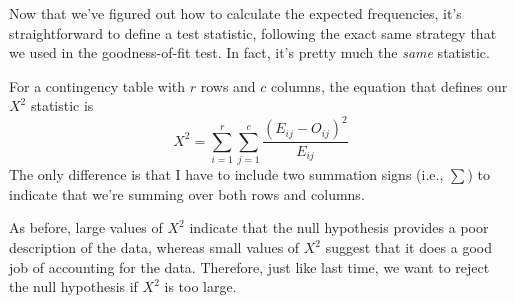 \vspace{0.5cm}
\begin{mdframed}[style=MyFrame,nobreak=true]
Now that we've figured out how to calculate the expected frequencies, it's straightforward to define a test statistic, following the exact same strategy that we used in the goodness-of-fit test. In fact, it's pretty much the {\it same} statistic. 

For a contingency table with $r$ rows and $c$ columns, the equation that defines our $X^2$ statistic is 
$$
X^2 = \sum_{i=1}^r\sum_{j=1}^c \frac{({E}_{ij} - O_{ij})^2}{{E}_{ij}}
$$
The only difference is that I have to include two summation signs (i.e., $\sum$) to indicate that we're summing over both rows and columns. 
\end{mdframed}

As before, large values of $X^2$ indicate that the null hypothesis provides a poor description of the data, whereas small values of $X^2$ suggest that it does a good job of accounting for the data. Therefore, just like last time, we want to reject the null hypothesis if $X^2$ is too large.

